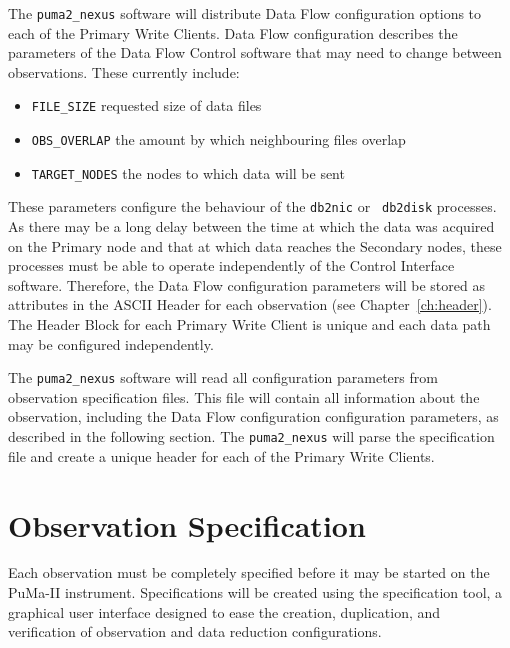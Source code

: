 The {\tt puma2\_nexus} software will distribute Data Flow configuration
options to each of the Primary Write Clients.  Data Flow configuration
describes the parameters of the Data Flow Control software that may
need to change between observations.  These currently
include:
\begin{itemize}
\item{\tt FILE\_SIZE} requested size of data files
\item{\tt OBS\_OVERLAP} the amount by which neighbouring files overlap
\item{\tt TARGET\_NODES} the nodes to which data will be sent
\end{itemize}
These parameters configure the behaviour of the {\tt db2nic} or {\tt
db2disk} processes.  As there may be a long delay between the time at
which the data was acquired on the Primary node and that at which data
reaches the Secondary nodes, these processes must be able to operate
independently of the Control Interface software.  Therefore, the
Data Flow configuration parameters will be stored as attributes in the
ASCII Header for each observation (see Chapter~\ref{ch:header}).  The
Header Block for each Primary Write Client is unique and each data
path may be configured independently.

The {\tt puma2\_nexus} software will read all configuration parameters
from observation specification files.  This file will contain all
information about the observation, including the Data Flow
configuration configuration parameters, as described in the following
section.  The {\tt puma2\_nexus} will parse the specification file and
create a unique header for each of the Primary Write Clients.

\section{Observation Specification}

Each observation must be completely specified before it may be started
on the PuMa-II instrument.  Specifications will be created using the
specification tool, a graphical user interface designed to ease the
creation, duplication, and verification of observation and data
reduction configurations.
